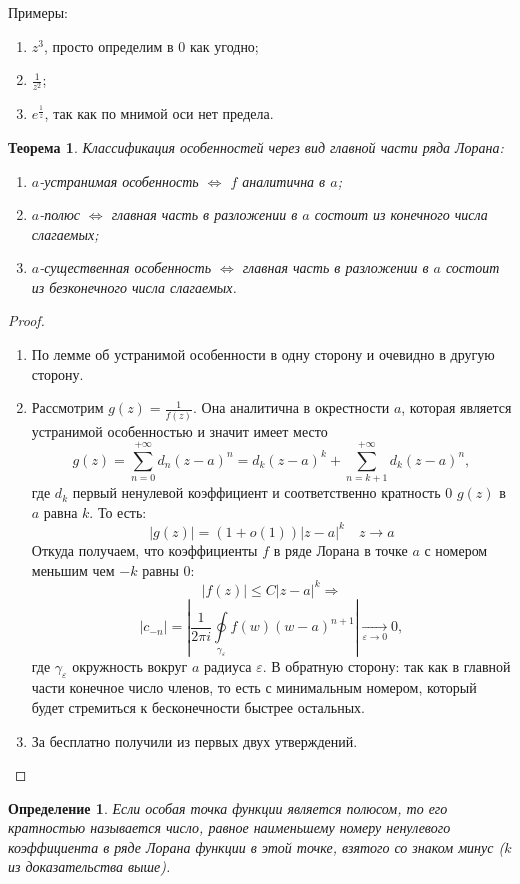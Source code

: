 \documentclass[12pt,a4paper]{article} %
\newtheorem{theorem}{Теорема}
\newtheorem{definition}{Определение}
\begin{document}
	Примеры:
	\begin{enumerate}
		\item $z^3$, просто определим в 0 как угодно;
		\item $\displaystyle\frac{1}{z^2}$;
		\item $e^{\frac{1}{z}}$, так как по мнимой оси нет предела.
	\end{enumerate}
	\begin{theorem}
		Классификация особенностей через вид главной части ряда Лорана:
		\begin{enumerate}
			\item $a$-устранимая особенность $\Longleftrightarrow$ $f$ аналитична в $a$;
			\item $a$-полюс $\Longleftrightarrow$ главная часть в разложении в $a$ состоит из конечного числа слагаемых;
			\item $a$-существенная особенность $\Longleftrightarrow$ главная часть в разложении в $a$ состоит из безконечного числа слагаемых.
		\end{enumerate}
	\end{theorem}
	\begin{proof}
		\,
		\begin{enumerate}
			\item По лемме об устранимой особенности в одну сторону и очевидно в другую сторону.
			\item Рассмотрим $g(z)=\displaystyle\frac{1}{f(z)}$. Она аналитична в окрестности $a$, которая является устранимой особенностью и значит имеет место
			$$g(z)=\displaystyle\sum_{n=0}^{+\infty}d_n(z-a)^n=d_k(z-a)^k+\sum_{n=k+1}^{+\infty}d_k(z-a)^n,$$
			где $d_k$ первый ненулевой коэффициент и соответственно кратность 0 $g(z)$ в $a$ равна $k$. То есть:
			$$|g(z)|=(1+o(1))|z-a|^k\quad z\rightarrow a$$
			Откуда получаем, что коэффициенты $f$ в ряде Лорана в точке $a$ с номером меньшим чем $-k$ равны 0:
			$$|f(z)|\leq C|z-a|^k\Rightarrow$$
			$$|c_{-n}|=\left|\displaystyle\frac{1}{2\pi i}\oint\limits_{\gamma_{\varepsilon}}f(w)(w-a)^{n+1}\right|\underset{\varepsilon\rightarrow 0}{\longrightarrow}0,$$
			где $\gamma_{\varepsilon}$ окружность вокруг $a$ радиуса $\varepsilon$. В обратную сторону: так как в главной части конечное число членов, то есть с минимальным номером, который будет стремиться к бесконечности быстрее остальных.
			\item За бесплатно получили из первых двух утверждений.
		\end{enumerate}
	\end{proof}
	\begin{definition}
		Если особая точка функции является полюсом, то его кратностью называется число, равное наименьшему номеру ненулевого коэффициента в ряде Лорана функции в этой точке, взятого со знаком минус ($k$ из доказательства выше).
	\end{definition}
\end{document}
